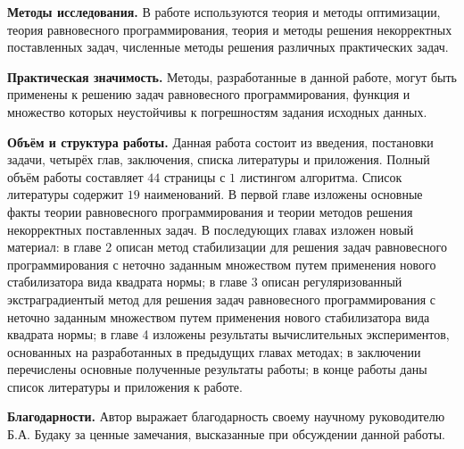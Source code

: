 	\textbf{Методы исследования.} В работе используются теория и методы оптимизации, теория равновесного программирования, теория и методы решения некорректных поставленных задач, численные методы решения различных практических задач.
	
	\textbf{Практическая значимость.} Методы, разработанные в данной работе, могут быть применены к решению задач равновесного программирования, функция и множество которых неустойчивы к погрешностям задания исходных данных.
	
	\textbf{Объём и структура работы.} Данная работа состоит из введения, постановки задачи, четырёх глав, заключения, списка литературы и приложения. Полный объём работы составляет $44$ страницы с $1$ листингом алгоритма. Список литературы содержит $19$ наименований. В первой главе изложены основные факты теории равновесного программирования и теории методов решения некорректных поставленных задач. В последующих главах изложен новый материал: в главе 2 описан метод стабилизации для решения задач равновесного программирования с неточно заданным множеством путем применения нового стабилизатора вида квадрата нормы; в главе 3 описан регуляризованный экстраградиентый метод для решения задач равновесного программирования с неточно заданным множеством путем применения нового стабилизатора вида квадрата нормы; в главе 4 изложены результаты вычислительных экспериментов, основанных на разработанных в предыдущих главах методах; в заключении перечислены основные полученные результаты работы; в конце работы даны список литературы и приложения к работе. 
	
	\textbf{Благодарности.} Автор выражает благодарность своему научному руководителю Б.А. Будаку за ценные замечания, высказанные при обсуждении данной работы.
	

\clearpage
